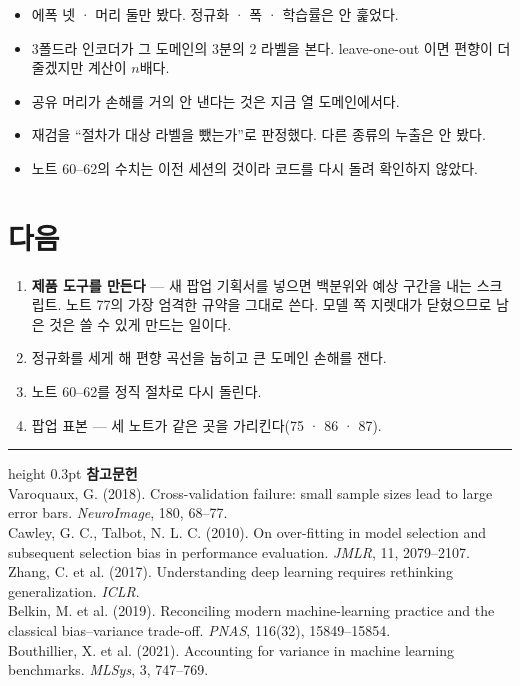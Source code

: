 \documentclass[10pt]{article}
\begin{document}
\begin{itemize}[leftmargin=1.1em,itemsep=0.15em]
\item 에폭 넷 · 머리 둘만 봤다. 정규화 · 폭 · 학습률은 안 훑었다.
\item 3폴드라 인코더가 그 도메인의 3분의 2 라벨을 본다. leave-one-out 이면
      편향이 더 줄겠지만 계산이 $n$배다.
\item 공유 머리가 손해를 거의 안 낸다는 것은 지금 열 도메인에서다.
\item 재검을 ``절차가 대상 라벨을 뺐는가''로 판정했다. 다른 종류의 누출은
      안 봤다.
\item 노트 60--62의 수치는 이전 세션의 것이라 코드를 다시 돌려 확인하지 않았다.
\end{itemize}

\section{다음}

\begin{enumerate}[leftmargin=1.1em,itemsep=0.15em]
\item \textbf{제품 도구를 만든다} --- 새 팝업 기획서를 넣으면 백분위와 예상
      구간을 내는 스크립트. 노트 77의 가장 엄격한 규약을 그대로 쓴다.
      모델 쪽 지렛대가 닫혔으므로 남은 것은 쓸 수 있게 만드는 일이다.
\item 정규화를 세게 해 편향 곡선을 눕히고 큰 도메인 손해를 잰다.
\item 노트 60--62를 정직 절차로 다시 돌린다.
\item 팝업 표본 --- 세 노트가 같은 곳을 가리킨다(75 · 86 · 87).
\end{enumerate}

\vspace{0.6em}
\hrule height 0.3pt
\vspace{0.5em}
{\footnotesize
\textbf{참고문헌}\\[0.3em]
Varoquaux, G. (2018). Cross-validation failure: small sample sizes lead to large
error bars. \emph{NeuroImage}, 180, 68--77.\\[0.15em]
Cawley, G. C., Talbot, N. L. C. (2010). On over-fitting in model selection and
subsequent selection bias in performance evaluation. \emph{JMLR}, 11, 2079--2107.\\[0.15em]
Zhang, C. et al. (2017). Understanding deep learning requires rethinking
generalization. \emph{ICLR}.\\[0.15em]
Belkin, M. et al. (2019). Reconciling modern machine-learning practice and the
classical bias--variance trade-off. \emph{PNAS}, 116(32), 15849--15854.\\[0.15em]
Bouthillier, X. et al. (2021). Accounting for variance in machine learning
benchmarks. \emph{MLSys}, 3, 747--769.
}
\end{document}
